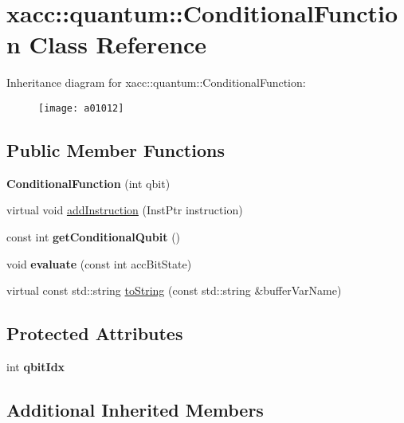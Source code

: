 \hypertarget{a01012}{}\section{xacc\+:\+:quantum\+:\+:Conditional\+Function Class Reference}
\label{a01012}
Inheritance diagram for xacc\+:\+:quantum\+:\+:Conditional\+Function\+:\begin{figure}[H]
\begin{center}
\leavevmode
\texttt{[image: a01012]}
\end{center}
\end{figure}
\subsection*{Public Member Functions}
\begin{DoxyCompactItemize}
\item 
\mbox{\label{a01012_aa28610a08ae04d62ccdd8359433100c3}} 
{\bfseries Conditional\+Function} (int qbit)
\item 
virtual void \hyperlink{a01012_a6aedad20f96390880efdc0a476b3273f}{add\+Instruction} (Inst\+Ptr instruction)
\item 
\mbox{\label{a01012_a804317333b6677a041a3071b5108c0df}} 
const int {\bfseries get\+Conditional\+Qubit} ()
\item 
\mbox{\label{a01012_a709c236a5beb62d9a3bd5265196fb6c9}} 
void {\bfseries evaluate} (const int acc\+Bit\+State)
\item 
virtual const std\+::string \hyperlink{a01012_aca7a5f849fece6fc28a904efee9a3370}{to\+String} (const std\+::string \&buffer\+Var\+Name)
\end{DoxyCompactItemize}
\subsection*{Protected Attributes}
\begin{DoxyCompactItemize}
\item 
\mbox{\label{a01012_a0310536801417c0eded28a4dea1efa44}} 
int {\bfseries qbit\+Idx}
\end{DoxyCompactItemize}
\subsection*{Additional Inherited Members}


